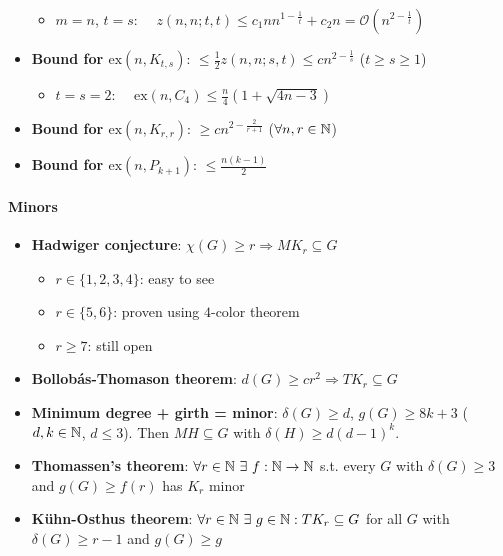 \begin{itemize}
  \begin{itemize}
    \item $ m = n $, $ t = s $: $ \quad z(n,n;t,t) \leq c_1 n n^{1-\frac{1}{t}}+c_2n = \mathcal{O}(n^{2-\frac{1}{t}}) $ 
  \end{itemize}
  \item \textbf{Bound for $ \text{ex}(n,K_{t,s}) $}: $ \leq \frac{1}{2}z(n,n;s,t) \leq cn^{2-\frac{1}{s}} $ ($ t \geq s \geq 1 $)
  \begin{itemize}
    \item $ t = s = 2 $: $ \quad \text{ex}(n,C_4) \leq \frac{n}{4}(1+\sqrt{4n - 3}) $ 
  \end{itemize}
  \item \textbf{Bound for $ \text{ex}(n,K_{r,r}) $}: $ \geq cn^{2-\frac{2}{r+1}} $ ($ \forall n,r \in \mathbb{N} $)
  \item \textbf{Bound for $ \text{ex}(n,P_{k+1}) $}: $ \leq \frac{n(k-1)}{2} $
\end{itemize}

\paragraph{Minors}
\begin{itemize}
  \item \textbf{Hadwiger conjecture}: $ \chi(G) \geq r \Rightarrow MK_r \subseteq G $
  \begin{itemize}
    \item $ r \in \{ 1,2,3,4 \} $: easy to see
    \item $ r \in \{ 5,6 \} $: proven using $ 4 $-color theorem
    \item $ r \geq 7 $: still open 
  \end{itemize}
  \item \textbf{Bollobás-Thomason theorem}: $ d(G) \geq cr^2 \Rightarrow TK_r \subseteq G $
  \item \textbf{Minimum degree + girth = minor}: $ \delta(G) \geq d $, $ g(G) \geq 8k+3 $ ($ d,k \in \mathbb{N} $, $ d \leq 3 $). Then $ MH \subseteq G $ with $ \delta(H) \geq d(d-1)^k $.
  \item \textbf{Thomassen's theorem}: $ \forall r \in \mathbb{N} \ \exists \ f: \mathbb{N} \to \mathbb{N} $ s.t. every $ G $ with $ \delta(G) \geq 3 $ and $ g(G) \geq f(r) $ has $ K_r $ minor
  \item \textbf{Kühn-Osthus theorem}: $ \forall r \in \mathbb{N} \ \exists \ g \in \mathbb{N} : TK_r \subseteq G $ for all $ G $ with $ \delta(G) \geq r -1 $ and $ g(G) \geq g $
\end{itemize}